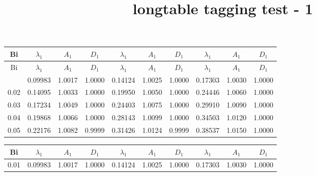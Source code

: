 \documentclass{article}
\title{longtable tagging test - 1}
\begin{document}
\begin{longtable}{|||c|ccc|ccc|ccc|||}
\hline\hline\hline
   Bi    & $\lambda_1$ & $A_1$ & $D_1$ & $\lambda_1$ & $A_1$ & $D_1$ & $\lambda_1$ & $A_1$ & $D_1$\rule{0pt}{10pt} \\
\hline
\endfirsthead
\hline\hline\hline
  Bi     & $\lambda_1$ & $A_1$ & $D_1$ & $\lambda_1$ & $A_1$ & $D_1$ & $\lambda_1$ & $A_1$ & $D_1$ \\
\hline
\endhead
\hline\hline\hline
\endfoot
\hline\hline\hline
\endlastfoot
0.01   & 0.09983  & 1.0017  & 1.0000  & 0.14124   & 1.0025  & 1.0000  & 0.17303  & 1.0030  & 1.0000\rule{0pt}{10pt} \\
0.02   & 0.14095  & 1.0033  & 1.0000  & 0.19950   & 1.0050  & 1.0000  & 0.24446  & 1.0060  & 1.0000 \\
0.03   & 0.17234  & 1.0049  & 1.0000  & 0.24403   & 1.0075  & 1.0000  & 0.29910  & 1.0090  & 1.0000 \\
0.04   & 0.19868  & 1.0066  & 1.0000  & 0.28143   & 1.0099  & 1.0000  & 0.34503  & 1.0120  & 1.0000 \\
0.05   & 0.22176  & 1.0082  & 0.9999  & 0.31426   & 1.0124  & 0.9999  & 0.38537  & 1.0150  & 1.0000 \\
\end{longtable}

\begin{table}[b]
%
\begin{tabular}{|c|ccc|ccc|ccc|}
\hline
   Bi  & $\lambda_1$ & $A_1$ & $D_1$ & $\lambda_1$ & $A_1$ & $D_1$ & $\lambda_1$ & $A_1$ & $D_1$\rule{0pt}{10pt}  \\
\hline
0.01   & 0.09983  & 1.0017  & 1.0000  & 0.14124   & 1.0025  & 1.0000  & 0.17303  & 1.0030  & 1.0000\rule{0pt}{10pt} \\
\hline
\end{tabular}
\end{table}
\end{document}
